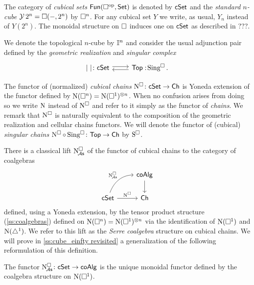 The category of \textit{cubical sets} $\mathsf{Fun}(\square^{\mathrm{op}}, \mathsf{Set})$ is denoted by $\mathsf{cSet}$ and
the \textit{standard $n$-cube} $\operatorname{\mathcal{Y}} 2^n = \square(-, 2^n)$ by $\square^n$.
For any cubical set $Y$ we write, as usual, $Y_n$ instead of $Y(2^n)$.
The monoidal structure on $\square$ induces one on $\mathsf{cSet}$ as described in ???.

We denote the topological $n$-cube by $\mathbb{I}^{n}$ and consider the usual adjunction pair defined by the \textit{geometric realization} and \textit{singular complex}
\[
\begin{tikzcd}
	\bars{\ } \colon \cSet \arrow[r, shift left=.5ex] &
	\Top :\! \cSing. \arrow[l, shift left=.5ex]
\end{tikzcd}
\]

The functor of (normalized) \textit{cubical chains} $\operatorname{N^{\square}} \colon \mathsf{cSet} \to \mathsf{Ch}$ is Yoneda extension of the functor defined by $\operatorname{N}(\square^n) = \operatorname{N}(\square^1)^{\otimes n}$.
When no confusion arises from doing so we write $\operatorname{N}$ instead of $\operatorname{N^{\square}}$ and refer to it simply as the functor of \textit{chains}.
We remark that $\operatorname{N^{\square}}$ is naturally equivalent to the composition of the geometric realization and cellular chains functors.
We will denote the functor of (cubical) \textit{singular chains} $\operatorname{N^{\square}} \circ \operatorname{Sing^{\square}} \colon \mathsf{Top} \to \mathsf{Ch}$ by $\operatorname{S^{\square}}$.

There is a classical lift $\operatorname{N^{\square}_{\!{\mathcal{A}\mathsf{s}}}}$ of the functor of cubical chains to the category of coalgebras
\[
\begin{tikzcd}
	& \coAlg \arrow[d] \\
	\cSet \arrow[r, "\cchains"] \arrow[ur, "\cchainsA", out=70, in=180] & \Ch
\end{tikzcd}
\]
defined, using a Yoneda extension, by the tensor product structure (\cref{ss:coalgebras}) defined on $\operatorname{N}(\square^n) = \operatorname{N}(\square^1)^{\otimes n}$ via the identification of $\operatorname{N}(\square^1)$ and $\operatorname{N}(\triangle^1)$.
We refer to this lift as the \textit{Serre coalgebra} structure on cubical chains.
We will prove in \cref{ss:cube_einfty revisited} a generalization of the following reformulation of this definition.

\begin{proposition}\label{p:serre coalgebra}
	The functor $\operatorname{N^{\square}_{\!{\mathcal{A}\mathsf{s}}}} \colon \mathsf{cSet} \to \mathsf{coAlg}$ is the unique monoidal functor defined by the coalgebra structure on $\operatorname{N}(\square^1)$.
\end{proposition}